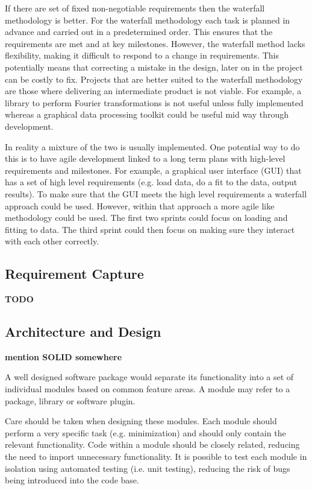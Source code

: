 \documentclass[jnr]{iosart2x}
\newcommand{\todo}[1]{\textbf{#1}}
\begin{document}
If there are set of fixed non-negotiable requirements then the waterfall methodology is better.
For the waterfall methodology each task is planned in advance and carried out in a predetermined order.
This ensures that the requirements are met and at key milestones.
However, the waterfall method lacks flexibility, making it difficult to respond to a change in requirements.
This potentially means that correcting a mistake in the design, later on in the project can be costly to fix.
Projects that are better suited to the waterfall methodology are those where delivering an intermediate product is not viable.
For example, a library to perform Fourier transformations is not useful unless fully implemented whereas a graphical data processing toolkit could be useful mid way through development.

In reality a mixture of the two is usually implemented.
One potential way to do this is to have agile development linked to a long term plans with high-level requirements and milestones.
For example, a graphical user interface (GUI) that has a set of high level requirements (e.g. load data, do a fit to the data, output results).
To make sure that the GUI meets the high level requirements a waterfall approach could be used.
However, within that approach a more agile like methodology could be used.
The first two sprints could focus on loading and fitting to data.
The third sprint could then focus on making sure they interact with each other correctly.

\subsection{Requirement Capture}
\label{Requirements}

\todo{TODO}

\subsection{Architecture and Design}
\label{Architecture}

\todo{mention SOLID somewhere}

A well designed software package would separate its functionality into a set of individual modules based on common feature areas.
A module may refer to a package, library or software plugin.

Care should be taken when designing these modules.
Each module should perform a very specific task (e.g. minimization) and should only contain the relevant functionality.
Code within a module should be closely related, reducing the need to import unnecessary functionality.
It is possible to test each module in isolation using automated testing (i.e. unit testing), reducing the risk of bugs being introduced into the code base.
\end{document}
